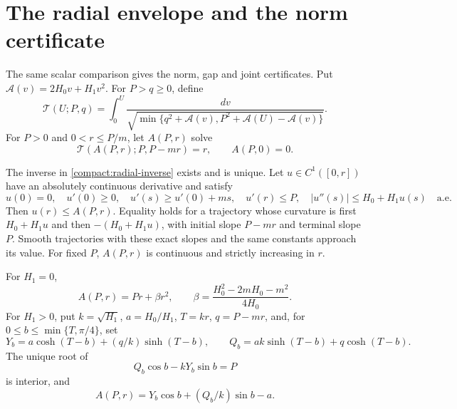 \section{The radial envelope and the norm certificate}
\label{bndnorm:section}\label{energy:section}
The same scalar comparison gives the norm, gap and joint certificates.
Put $\mathcal A(v)=2H_0v+H_1v^2$. For $P>q\ge0$, define
\begin{equation}\label{boundarygap:time}
 \mathcal T(U;P,q)=\int_0^U
 \frac{dv}{\sqrt{\min\{q^2+\mathcal A(v),
                  P^2+\mathcal A(U)-\mathcal A(v)\}}}.
\end{equation}
For $P>0$ and $0<r\le P/m$, let $A(P,r)$ solve
\begin{equation}\label{compact:radial-inverse}
 \mathcal T(A(P,r);P,P-mr)=r,
 \qquad A(P,0)=0.
\end{equation}

\begin{lemma}\label{compact:radial}
The inverse in \eqref{compact:radial-inverse} exists and is unique.
Let $u\in C^1([0,r])$ have an absolutely continuous derivative and satisfy
\[
 u(0)=0,\quad u'(0)\ge0,\quad
 u'(s)\ge u'(0)+ms,\quad u'(r)\le P,
 \quad |u''(s)|\le H_0+H_1u(s)\quad\text{a.e.}
\]
Then $u(r)\le A(P,r)$. Equality holds for a trajectory whose curvature
is first $H_0+H_1u$ and then $-(H_0+H_1u)$, with initial slope
$P-mr$ and terminal slope $P$. Smooth trajectories with these exact
slopes and the same constants approach its value.
For fixed $P$, $A(P,r)$ is continuous and strictly increasing in $r$.

For $H_1=0$,
\begin{equation}\label{compact:radial-constant}
 A(P,r)=Pr+\beta r^2,\qquad
 \beta=\frac{H_0^2-2mH_0-m^2}{4H_0}.
\end{equation}
For $H_1>0$, put $k=\sqrt{H_1}$, $a=H_0/H_1$, $T=kr$, $q=P-mr$,
and, for $0\le b\le\min\{T,\pi/4\}$, set
\[
 Y_b=a\cosh(T-b)+(q/k)\sinh(T-b),\qquad
 Q_b=ak\sinh(T-b)+q\cosh(T-b).
\]
The unique root of
\begin{equation}\label{compact:radial-switch}
 Q_b\cos b-kY_b\sin b=P
\end{equation}
is interior, and
\begin{equation}\label{compact:radial-value}
 A(P,r)=Y_b\cos b+(Q_b/k)\sin b-a.
\end{equation}
\end{lemma}

